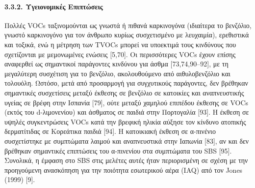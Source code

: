 \paragraph{3.3.2. Υγειονομικές Επιπτώσεις}
Πολλές VOCs ταξινομούνται ως γνωστά ή πιθανά καρκινογόνα (ιδιαίτερα το βενζόλιο, γνωστό καρκινογόνο για τον άνθρωπο κυρίως συσχετισμένο με λευχαιμία), ερεθιστικά και τοξικά, ενώ η μέτρηση των TVOCs μπορεί να υποεκτιμά τους κινδύνους που σχετίζονται με μεμονωμένες ενώσεις [5,70]. Οι περισσότερες VOCs έχουν επίσης αναφερθεί ως σημαντικοί παράγοντες κινδύνου για άσθμα [73,74,90–92], με τη μεγαλύτερη συσχέτιση για το βενζόλιο, ακολουθούμενο από αιθυλοβενζόλιο και τολουόλη. Ωστόσο, μετά από προσαρμογή για συγχυτικούς παράγοντες, δεν βρέθηκαν σημαντικές συσχετίσεις μεταξύ έκθεσης σε βενζόλιο σε κατοικίες και αναπνευστικής υγείας σε βρέφη στην Ισπανία [79], ούτε μεταξύ χαμηλού επιπέδου έκθεσης σε VOCs (εκτός του d-λιμονενίου) και άσθματος σε παιδιά στην Πορτογαλία [93]. Η έκθεση σε υψηλές συγκεντρώσεις VOCs κατά την βρεφική ηλικία αύξησε τον κίνδυνο ατοπικής δερματίτιδας σε Κορεάτικα παιδιά [94]. Η κατοικιακή έκθεση σε α-πινένιο συσχετίστηκε με συμπτώματα λαιμού και αναπνευστικά στην Ιαπωνία [83], αν και δεν βρέθηκαν σημαντικές επιπτώσεις του α-πινενίου στα συμπτώματα του SBS [95]. Συνολικά, η έμφαση στο SBS στις μελέτες αυτές ήταν περιορισμένη σε σχέση με την προηγούμενη ανασκόπηση για την ποιότητα εσωτερικού αέρα (IAQ) από τον Jones (1999) [9].

